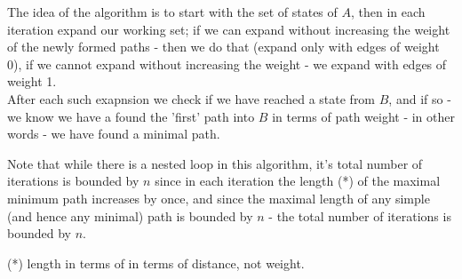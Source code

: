 \documentclass{article}
\begin{document}
\begin{enumerate}[label=\textbf{\alph*.}]
    The idea of the algorithm is to start with the set of states
    of $A$, then in each iteration expand our working set;
    if we can expand without increasing the weight of the newly formed paths -
    then we do that (expand only with edges of weight 0),
    if we cannot expand without increasing the weight - 
    we expand with edges of weight 1.\\
    After each such exapnsion we check if we have reached a state from $B$,
    and if so - we know we have a found the 'first' path into $B$ in terms of path weight -
    in other words - we have found a minimal path.

    Note that while there is a nested loop in this algorithm,
    it's total number of iterations is bounded by $n$ since
    in each iteration the length (*) of the maximal minimum path increases by once,
    and since the maximal length of any simple (and hence any minimal) path 
    is bounded by $n$ - the total number of iterations is bounded by $n$.
    
    (*) length in terms of in terms of distance, not weight.
\end{enumerate}
    
\end{document}
